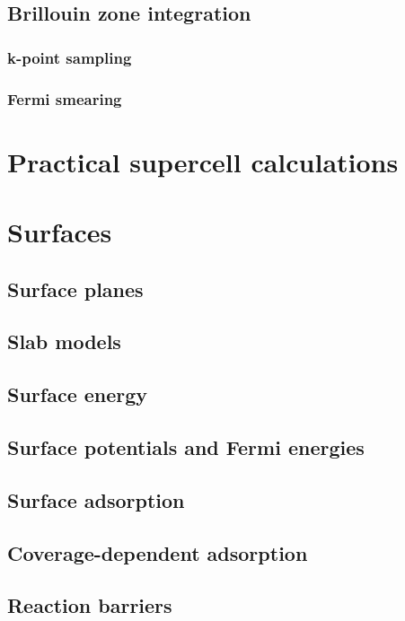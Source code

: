 \documentclass[11pt]{article}
\begin{document}
\subsection{Brillouin zone integration}
\label{sec:org6efb032}
\subsubsection{k-point sampling}
\label{sec:orge8b1b0c}
\subsubsection{Fermi smearing}
\label{sec:org3490c06}
\newpage
\section{Practical supercell calculations}
\label{sec:org009ae73}
\newpage
\section{Surfaces}
\label{sec:org66b64e5}
\subsection{Surface planes}
\label{sec:orgc110d70}
\subsection{Slab models}
\label{sec:orgc97a55a}
\subsection{Surface energy}
\label{sec:org158be54}
\subsection{Surface potentials and Fermi energies}
\label{sec:orgbd40b88}
\subsection{Surface adsorption}
\label{sec:org7dd3bfa}
\subsection{Coverage-dependent adsorption}
\label{sec:org77f7f9b}
\subsection{Reaction barriers}
\label{sec:org64145c6}
\end{document}
